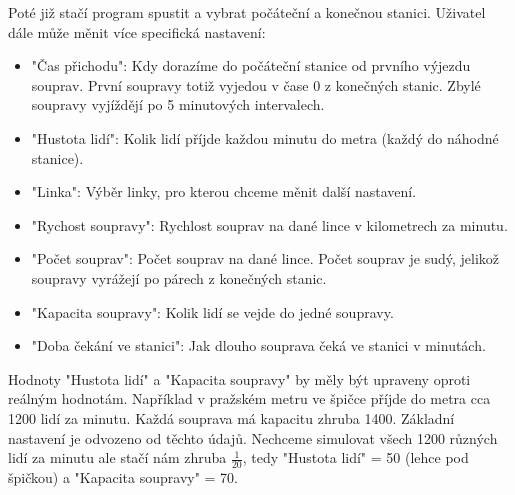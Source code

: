 \documentclass[12pt, a4paper]{article}
\begin{document}
Poté již stačí program spustit a vybrat počáteční a konečnou stanici. Uživatel dále může měnit více specifická nastavení:
\begin{itemize}
    \item "Čas přichodu": Kdy dorazíme do počáteční stanice od prvního výjezdu souprav. První soupravy totiž vyjedou v čase 0 z konečných stanic. Zbylé soupravy vyjíždějí po 5 minutových intervalech.
    \item "Hustota lidí": Kolik lidí příjde každou minutu do metra (každý do náhodné stanice).
    \item "Linka": Výběr linky, pro kterou chceme měnit další nastavení.
    \item "Rychost soupravy": Rychlost souprav na dané lince v kilometrech za minutu.
    \item "Počet souprav": Počet souprav na dané lince. Počet souprav je sudý, jelikož soupravy vyrážejí po párech z konečných stanic.
    \item "Kapacita soupravy": Kolik lidí se vejde do jedné soupravy.
    \item "Doba čekání ve stanici": Jak dlouho souprava čeká ve stanici v minutách.
\end{itemize}

Hodnoty "Hustota lidí" a "Kapacita soupravy" by měly být upraveny oproti reálným hodnotám. Například v pražském metru ve špičce příjde do metra cca 1200 lidí za minutu. Každá souprava má kapacitu zhruba 1400. Základní nastavení je odvozeno od těchto údajů. Nechceme simulovat všech 1200 různých lidí za minutu ale stačí nám zhruba $\frac{1}{20}$, tedy "Hustota lidí" = 50 (lehce pod špičkou) a "Kapacita soupravy" = 70.
\end{document}
